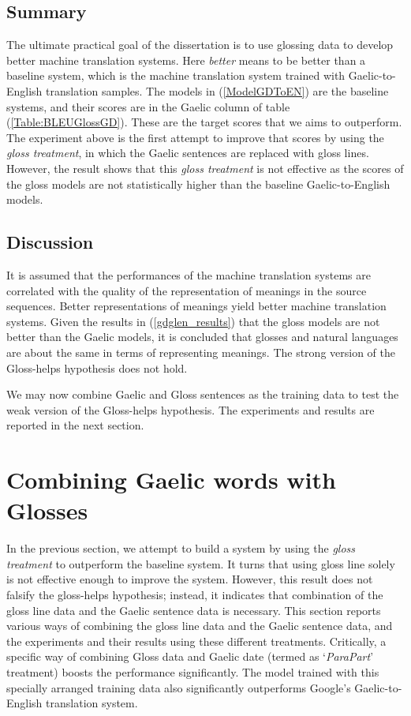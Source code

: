 \documentclass[a4paper]{article}
\begin{document}
\subsection{Summary}
The ultimate practical goal of the dissertation is to use glossing data to develop better machine translation systems. Here \textit{better} means to be better than a baseline system, which is the machine translation system trained with Gaelic-to-English translation samples. The models in (\ref{ModelGDToEN}) are the baseline systems, and their scores are in the Gaelic column of table (\ref{Table:BLEUGlossGD}). These are the target scores that we aims to outperform. The experiment above is the first attempt to improve that scores by using the \textit{gloss treatment}, in which the Gaelic sentences are replaced with gloss lines.  However, the result shows that this \textit{gloss treatment} is not effective as the scores of the gloss models are not statistically higher than the baseline Gaelic-to-English models.  

\subsection{Discussion}
It is assumed that the performances of the machine translation systems are correlated with the quality of the representation of meanings in the source sequences. Better representations of meanings yield better machine translation systems. Given the results in (\ref{gdglen_results}) that the gloss models are not better than the Gaelic models, it is concluded that glosses and natural languages are about the same in terms of representing meanings. The strong version of the Gloss-helps hypothesis does not hold. 

We may now combine Gaelic and Gloss sentences as the training data to test the weak version of the Gloss-helps hypothesis. The experiments and results are reported in the next section. 

\section{Combining Gaelic words with Glosses}\label{gd_plus_gl_to_en}

In the previous section, we attempt to build a system by using the \textit{gloss treatment} to outperform the baseline system. It turns that using gloss line solely is not effective enough to improve the system. However, this result does not falsify the gloss-helps hypothesis; instead, it indicates that combination of the gloss line data and the Gaelic sentence data is necessary. This section reports various ways of combining the gloss line data and the Gaelic sentence data, and the experiments and their results using these different treatments. Critically, a specific way of combining Gloss data and Gaelic date (termed as `\textit{ParaPart}' treatment) boosts the performance significantly. The model trained with this specially arranged training data also significantly outperforms Google's Gaelic-to-English translation system.
\end{document}
